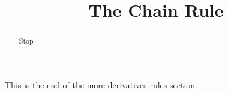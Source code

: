 \documentclass[handout]{ximera}
\title{The Chain Rule}
\begin{document}
\begin{abstract} Stop
\end{abstract}

\maketitle

This is the end of the more derivatives rules section.
\end{document}
